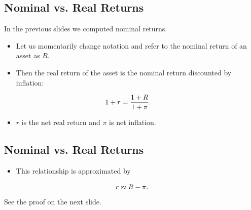 \documentclass[letterpaper,10pt,english]{sphinxmanual}
\begin{document}
\subsection{Nominal vs. Real Returns}
\label{returns:nominal-vs-real-returns}
In the previous slides we computed nominal returns.
\begin{itemize}
\item {} 
Let us momentarily change notation and refer to the nominal return
of an asset as $R$.

\end{itemize}
\begin{itemize}
\item {} 
Then the real return of the asset is the nominal return discounted
by inflation:

\end{itemize}
\begin{gather}
\begin{split}1+r & = \frac{1+R}{1+\pi}.\end{split}\notag
\end{gather}\begin{itemize}
\item {} 
$r$ is the net real return and $\pi$ is net inflation.

\end{itemize}


\subsection{Nominal vs. Real Returns}
\label{returns:id3}\begin{itemize}
\item {} 
This relationship is approximated by

\end{itemize}
\begin{gather}
\begin{split}r \approx R - \pi.\end{split}\notag
\end{gather}
See the proof on the next slide.
\end{document}
